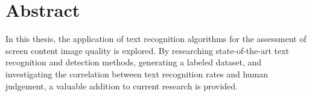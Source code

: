 \chapter{Abstract}

In this thesis, the application of text recognition algorithms for the assessment of screen content image quality is explored.
By researching state-of-the-art text recognition and detection methods, generating a labeled dataset, and investigating the correlation between text recognition rates and human judgement, a valuable addition to current research is provided.
